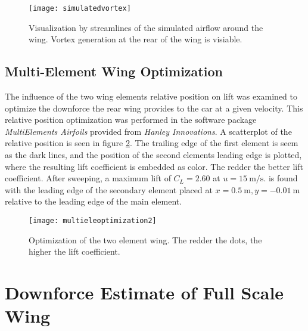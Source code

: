   \begin{figure}
    \texttt{[image: simulatedvortex]}
    \caption{Visualization by streamlines of the simulated airflow around the wing. Vortex generation at the rear of the wing is visiable.}
    \label{fig:simvortex}
  \end{figure}

  \subsection{Multi-Element Wing Optimization}
  The influence of the two wing elements relative position on lift was examined to optimize the downforce the rear wing provides to the car at a given velocity. This relative position optimization was performed in the software package \emph{MultiElements Airfoils} provided from \emph{Hanley Innovations}. A scatterplot of the relative position is seen in figure \ref{fig:multieleoptimization}. The trailing edge of the first element is seem as the dark lines, and the position of the second elements leading edge is plotted, where the resulting lift coefficient is embedded as color. The redder the better lift coefficient. After sweeping, a maximum lift of $C_L = 2.60$  at $u = \SI{15}{\metre\per\second}$. is found with the leading edge of the secondary element placed at $x=\SI{0.5}{\metre},y=\SI{-0.01}{\metre}$ relative to the leading edge of the main element.

  \begin{figure}
    \texttt{[image: multieleoptimization2]}
    \caption{Optimization of the two element wing. The redder the dots, the higher the lift coefficient.}
    \label{fig:multieleoptimization}
  \end{figure}

\section{Downforce Estimate of Full Scale Wing}
